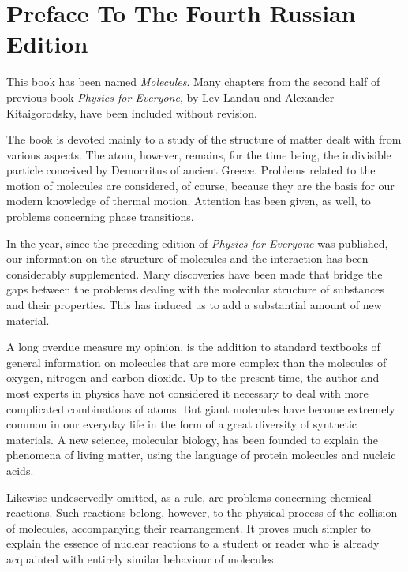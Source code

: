

\chapter[Preface]{Preface To The \newline Fourth Russian Edition}

This book has been named \emph{Molecules}. Many chapters from the second half of previous book \emph{Physics for Everyone}, by Lev Landau and Alexander Kitaigorodsky, have been included without revision.

The book is devoted mainly to a study of the structure
of matter dealt with from various aspects. The atom,
however, remains, for the time being, the indivisible
particle conceived by Democritus of ancient Greece.
Problems related to the motion of molecules are con­sidered, of course, because they are the basis for our modern knowledge of thermal motion. Attention has been given, as well, to problems concerning phase transitions.

In the year, since the preceding edition of \emph{Physics for Everyone} was published, our information on the structure of molecules and the interaction has been considerably supplemented. Many discoveries have been made that bridge the gaps between the problems dealing with the molecular structure of substances and their properties. This has induced us to add a substantial amount of new material.

A long overdue measure my opinion, is the addition to standard textbooks of general information on molecules that are more complex than the molecules of oxygen, nitrogen and carbon dioxide. Up to the present time, the author and most experts in physics have not considered it necessary to deal with more complicated combinations of atoms. But giant molecules have become extremely common in our everyday life in the form of a great diversity of synthetic materials. A new science, molecular biology, has been founded to explain the phenomena of living matter, using the language of protein molecules and nucleic acids.

Likewise undeservedly omitted, as a rule, are problems concerning chemical reactions. Such reactions belong, however, to the physical process of the collision of molecules, accompanying their rearrangement. It proves much simpler to explain the essence of nuclear reactions to a student or reader who is already acquainted with entirely similar behaviour of molecules.

